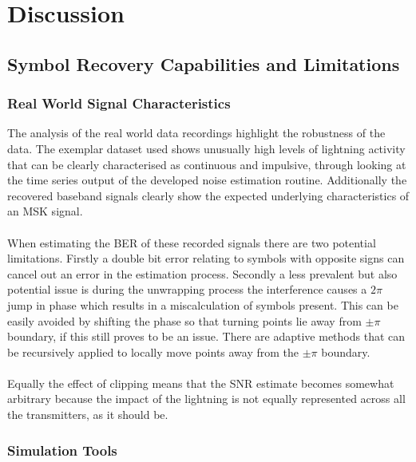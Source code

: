 \chapter{Discussion}

\section{Symbol Recovery Capabilities and Limitations}
\subsection{Real World Signal Characteristics}
The analysis of the real world data recordings highlight the robustness of the data. The exemplar dataset used shows unusually high levels of lightning activity that can be clearly characterised as continuous and impulsive, through looking at the time series output of the developed noise estimation routine. Additionally the recovered baseband signals clearly show the expected underlying characteristics of an MSK signal.  
\\\\
When estimating the BER of these recorded signals there are two potential limitations. Firstly a double bit error relating to symbols with opposite signs can cancel out an error in the estimation process. Secondly a less prevalent but also potential issue is during the unwrapping process the interference causes a $2\pi$ jump in phase which results in a miscalculation of symbols present. This can be easily avoided by shifting the phase so that turning points lie away from $\pm\pi$ boundary, if this still proves to be an issue. There are adaptive methods that can be recursively applied to locally move points away from the $\pm\pi$ boundary. 
\\\\
Equally the effect of clipping means that the SNR estimate becomes somewhat arbitrary because the impact of the lightning is not equally represented across all the transmitters, as it should be.

\subsection{Simulation Tools}

